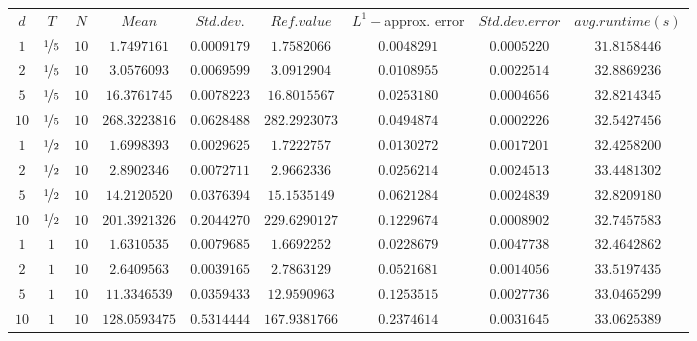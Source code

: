 \begin{tabular}{ccccccccc}
$d$ & $T$ & $N$ & $Mean$ & $Std. dev.$ & $Ref. value$ & $L^1-$approx. error & $Std. dev. error$ & $avg. runtime (s)$\\
$1$ & $\nicefrac{1}{5}$ & $10$ & $1.7497161$ & $0.0009179$ & $1.7582066$ & $0.0048291$ & $0.0005220$ & $31.8158446$\\
$2$ & $\nicefrac{1}{5}$ & $10$ & $3.0576093$ & $0.0069599$ & $3.0912904$ & $0.0108955$ & $0.0022514$ & $32.8869236$\\
$5$ & $\nicefrac{1}{5}$ & $10$ & $16.3761745$ & $0.0078223$ & $16.8015567$ & $0.0253180$ & $0.0004656$ & $32.8214345$\\
$10$ & $\nicefrac{1}{5}$ & $10$ & $268.3223816$ & $0.0628488$ & $282.2923073$ & $0.0494874$ & $0.0002226$ & $32.5427456$\\
$1$ & $\nicefrac{1}{2}$ & $10$ & $1.6998393$ & $0.0029625$ & $1.7222757$ & $0.0130272$ & $0.0017201$ & $32.4258200$\\
$2$ & $\nicefrac{1}{2}$ & $10$ & $2.8902346$ & $0.0072711$ & $2.9662336$ & $0.0256214$ & $0.0024513$ & $33.4481302$\\
$5$ & $\nicefrac{1}{2}$ & $10$ & $14.2120520$ & $0.0376394$ & $15.1535149$ & $0.0621284$ & $0.0024839$ & $32.8209180$\\
$10$ & $\nicefrac{1}{2}$ & $10$ & $201.3921326$ & $0.2044270$ & $229.6290127$ & $0.1229674$ & $0.0008902$ & $32.7457583$\\
$1$ & $1$ & $10$ & $1.6310535$ & $0.0079685$ & $1.6692252$ & $0.0228679$ & $0.0047738$ & $32.4642862$\\
$2$ & $1$ & $10$ & $2.6409563$ & $0.0039165$ & $2.7863129$ & $0.0521681$ & $0.0014056$ & $33.5197435$\\
$5$ & $1$ & $10$ & $11.3346539$ & $0.0359433$ & $12.9590963$ & $0.1253515$ & $0.0027736$ & $33.0465299$\\
$10$ & $1$ & $10$ & $128.0593475$ & $0.5314444$ & $167.9381766$ & $0.2374614$ & $0.0031645$ & $33.0625389$\\
\end{tabular}
